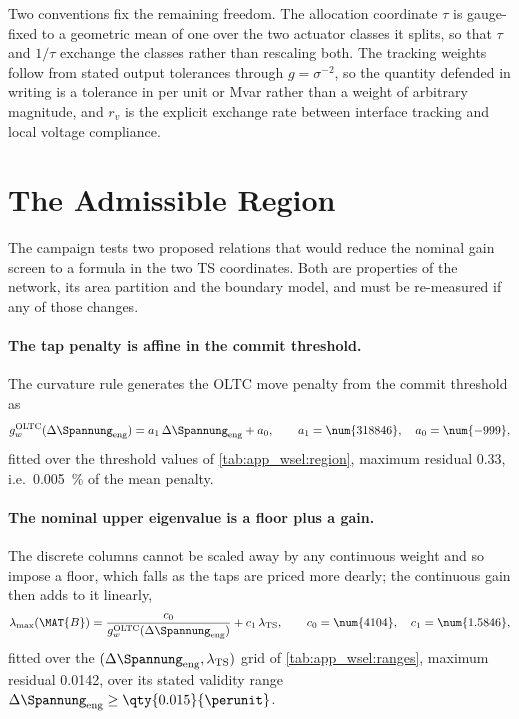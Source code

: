 Two conventions fix the remaining freedom.
The allocation coordinate $\tau$ is gauge-fixed to a geometric mean of one over the two actuator classes it splits, so that $\tau$ and $1/\tau$ exchange the classes rather than rescaling both.
The tracking weights follow from stated output tolerances through $g = \sigma^{-2}$, so the quantity defended in writing is a tolerance in per unit or Mvar rather than a weight of arbitrary magnitude, and $r_{v}$ is the explicit exchange rate between interface tracking and local voltage compliance.

\section{The Admissible Region}\label{ch:app_wsel:region}

The campaign tests two proposed relations that would reduce the nominal gain screen to a formula in the two \gls{TS} coordinates.
Both are properties of the network, its area partition and the boundary model, and must be re-measured if any of those changes.

\paragraph{The tap penalty is affine in the commit threshold.}
The curvature rule generates the \gls{OLTC} move penalty from the commit threshold as
\begin{equation}
	g_{w}^{\mathrm{OLTC}}(\Delta\Spannung_{\mathrm{eng}}) = a_{1}\,\Delta\Spannung_{\mathrm{eng}} + a_{0},
	\qquad a_{1} = \num{318846}, \quad a_{0} = \num{-999},
	\label{eq:app_wsel:gwoltc}
\end{equation}
fitted over the threshold values of \cref{tab:app_wsel:region}, maximum residual \num{0.33}, i.e.\ \qty{0.005}{\percent} of the mean penalty.

\paragraph{The nominal upper eigenvalue is a floor plus a gain.}
The discrete columns cannot be scaled away by any continuous weight and so impose a floor, which falls as the taps are priced more dearly; the continuous gain then adds to it linearly,
\begin{equation}
	\lambda_{\max}(\MAT{B}) = \frac{c_{0}}{g_{w}^{\mathrm{OLTC}}(\Delta\Spannung_{\mathrm{eng}})} + c_{1}\,\lambda_{\mathrm{TS}},
	\qquad c_{0} = \num{4104}, \quad c_{1} = \num{1.5846},
	\label{eq:app_wsel:rho}
\end{equation}
fitted over the $(\Delta\Spannung_{\mathrm{eng}},\lambda_{\mathrm{TS}})$ grid of \cref{tab:app_wsel:ranges}, maximum residual \num{0.0142}, over its stated validity range $\Delta\Spannung_{\mathrm{eng}} \geq \qty{0.015}{\perunit}$.

